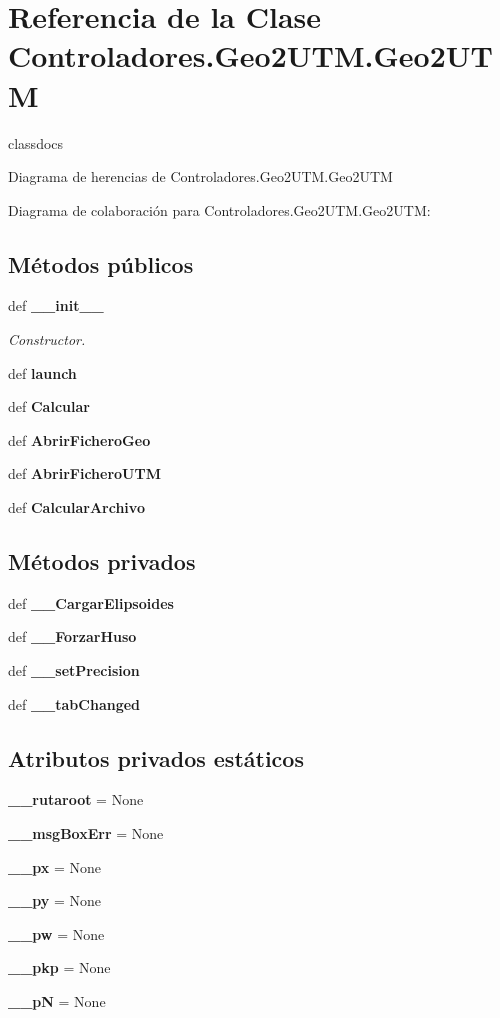 \section{Referencia de la Clase Controladores.\-Geo2\-U\-T\-M.\-Geo2\-U\-T\-M}
\label{classControladores_1_1Geo2UTM_1_1Geo2UTM}


classdocs  




Diagrama de herencias de Controladores.\-Geo2\-U\-T\-M.\-Geo2\-U\-T\-M


Diagrama de colaboración para Controladores.\-Geo2\-U\-T\-M.\-Geo2\-U\-T\-M\-:
\subsection*{Métodos públicos}
\begin{DoxyCompactItemize}
\item 
def {\bf \-\_\-\-\_\-init\-\_\-\-\_\-}
\begin{DoxyCompactList}\small\item\em Constructor. \end{DoxyCompactList}\item 
def {\bf launch}
\item 
def {\bf Calcular}
\item 
def {\bf Abrir\-Fichero\-Geo}
\item 
def {\bf Abrir\-Fichero\-U\-T\-M}
\item 
def {\bf Calcular\-Archivo}
\end{DoxyCompactItemize}
\subsection*{Métodos privados}
\begin{DoxyCompactItemize}
\item 
def {\bf \-\_\-\-\_\-\-Cargar\-Elipsoides}
\item 
def {\bf \-\_\-\-\_\-\-Forzar\-Huso}
\item 
def {\bf \-\_\-\-\_\-set\-Precision}
\item 
def {\bf \-\_\-\-\_\-tab\-Changed}
\end{DoxyCompactItemize}
\subsection*{Atributos privados estáticos}
\begin{DoxyCompactItemize}
\item 
{\bf \-\_\-\-\_\-rutaroot} = None
\item 
{\bf \-\_\-\-\_\-msg\-Box\-Err} = None
\item 
{\bf \-\_\-\-\_\-px} = None
\item 
{\bf \-\_\-\-\_\-py} = None
\item 
{\bf \-\_\-\-\_\-pw} = None
\item 
{\bf \-\_\-\-\_\-pkp} = None
\item 
{\bf \-\_\-\-\_\-p\-N} = None
\end{DoxyCompactItemize}


